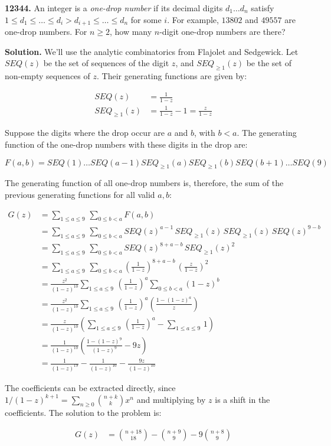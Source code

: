 \documentclass{letter}
\begin{document}
\newtheorem{lemma}{Lemma}

\begin{letter}{}
  \textbf{12344.} An integer is a \textit{one-drop number} if its decimal digits $d_1\ldots d_n$ satisfy $1\le d_1 \le \ldots\le d_i > d_{i+1} \le \ldots\le d_n$ for some $i$. For example, $13802$ and $49557$ are one-drop numbers. For $n \ge 2$, how many $n$-digit one-drop numbers are there?

  \textbf{Solution.} We'll use the analytic combinatorics from Flajolet and Sedgewick. Let $SEQ(z)$ be the set of sequences of the digit $z$, and $SEQ_{\ge 1}(z)$ be the set of non-empty sequences of $z$. Their generating functions are given by:

\begin{align*}
SEQ(z) &= \frac{1}{1-z} \\
SEQ_{\ge 1}(z) &= \frac{1}{1-z} - 1 = \frac{z}{1-z} 
\end{align*} 

Suppose the digits where the drop occur are $a$ and $b$, with $b<a$. The generating function of the one-drop numbers with these digits in the drop are:

$$F(a, b) = SEQ(1)\ldots SEQ(a-1)SEQ_{\ge 1}(a)SEQ_{\ge 1}(b)SEQ(b+1)\ldots SEQ(9)$$

The generating function of all one-drop numbers is, therefore, the sum of the previous generating functions for all valid $a, b$:

\begin{align*}
G(z) &= \sum_{1\le a\le 9}\,\sum_{0 \le b < a} F(a,b) \\
     &= \sum_{1\le a\le 9}\,\sum_{0 \le b < a} SEQ(z)^{a-1}\, SEQ_{\ge 1}(z)\, SEQ_{\ge 1}(z)\, SEQ(z)^{9-b}\\
     &= \sum_{1\le a\le 9}\,\sum_{0 \le b < a} SEQ(z)^{8+a-b}\,SEQ_{\ge 1}(z)^2\\
     &= \sum_{1\le a\le 9}\,\sum_{0 \le b < a} \left(\frac{1}{1-z}\right)^{8+a-b}\,\left(\frac{z}{1-z}\right)^2\\
     &=  \frac{z^2}{(1-z)^{10}}\sum_{1\le a\le 9}\,\left(\frac{1}{1-z}\right)^{a}
\sum_{0 \le b < a} \left(1-z\right)^{b}\\
     &=  \frac{z^2}{(1-z)^{10}}\sum_{1\le a\le 9}\,\left(\frac{1}{1-z}\right)^{a}\left(\frac{1-\left(1-z\right)^{a}}{z}\right)\\
     &=  \frac{z}{(1-z)^{10}}\left(\sum_{1\le a\le 9}\,\left(\frac{1}{1-z}\right)^{a}-\sum_{1\le a\le 9}\,1\right)\\
     &=  \frac{1}{(1-z)^{10}}\left(\frac{1-\left(1-z\right)^9}{\left(1-z\right)^9}-9z\right)\\
     &=  \frac{1}{(1-z)^{19}}-\frac{1}{(1-z)^{10}}-\frac{9z}{(1-z)^{10}}
\end{align*}

The coefficients can be extracted directly, since $1/(1-z)^{k+1} = \sum_{n\ge 0}{n+k\choose k}x^n$ and multiplying by $z$ is a shift in the coefficients. The solution to the problem is:

\begin{align*}
[z^n]G(z) &= {n+18\choose 18}-{n+9\choose 9}-9{n+8\choose 9}
\end{align*}

\end{letter}
\end{document}
